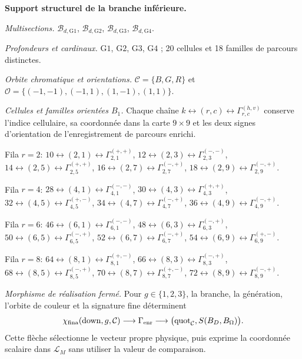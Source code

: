 \medskip
{}
\noindent\textbf{Support structurel de la branche inférieure.}\par
\noindent\textit{Multisections.} \(\mathcal B_{d,\mathrm{G1}}\), \(\mathcal B_{d,\mathrm{G2}}\), \(\mathcal B_{d,\mathrm{G3}}\), \(\mathcal B_{d,\mathrm{G4}}\).\par
\noindent\textit{Profondeurs et cardinaux.} $\mathrm{G1}$, $\mathrm{G2}$, $\mathrm{G3}$, $\mathrm{G4}$ ; 20 cellules et 18 familles de parcours distinctes.\par
\noindent\textit{Orbite chromatique et orientations.} $\mathcal C=\{B,G,R\}$ et $\mathcal O=\{(-1,-1),(-1,1),(1,-1),(1,1)\}$.\par
\noindent\textit{Cellules et familles orientées $B_1$.} Chaque chaîne $k\leftrightarrow(r,c)\leftrightarrow\Gamma_{r,c}^{(h,v)}$ conserve l’indice cellulaire, sa coordonnée dans la carte $9\times9$ et les deux signes d’orientation de l’enregistrement de parcours enrichi.\par
\noindent Fila $r=2$: $10\leftrightarrow(2,1)\leftrightarrow\Gamma_{2,1}^{(+,+)}$, $12\leftrightarrow(2,3)\leftrightarrow\Gamma_{2,3}^{(-,-)}$, $14\leftrightarrow(2,5)\leftrightarrow\Gamma_{2,5}^{(+,+)}$, $16\leftrightarrow(2,7)\leftrightarrow\Gamma_{2,7}^{(-,+)}$, $18\leftrightarrow(2,9)\leftrightarrow\Gamma_{2,9}^{(-,+)}$.\par
\noindent Fila $r=4$: $28\leftrightarrow(4,1)\leftrightarrow\Gamma_{4,1}^{(-,-)}$, $30\leftrightarrow(4,3)\leftrightarrow\Gamma_{4,3}^{(+,+)}$, $32\leftrightarrow(4,5)\leftrightarrow\Gamma_{4,5}^{(+,-)}$, $34\leftrightarrow(4,7)\leftrightarrow\Gamma_{4,7}^{(-,+)}$, $36\leftrightarrow(4,9)\leftrightarrow\Gamma_{4,9}^{(-,+)}$.\par
\noindent Fila $r=6$: $46\leftrightarrow(6,1)\leftrightarrow\Gamma_{6,1}^{(-,-)}$, $48\leftrightarrow(6,3)\leftrightarrow\Gamma_{6,3}^{(-,+)}$, $50\leftrightarrow(6,5)\leftrightarrow\Gamma_{6,5}^{(-,+)}$, $52\leftrightarrow(6,7)\leftrightarrow\Gamma_{6,7}^{(-,+)}$, $54\leftrightarrow(6,9)\leftrightarrow\Gamma_{6,9}^{(+,-)}$.\par
\noindent Fila $r=8$: $64\leftrightarrow(8,1)\leftrightarrow\Gamma_{8,1}^{(+,-)}$, $66\leftrightarrow(8,3)\leftrightarrow\Gamma_{8,3}^{(-,+)}$, $68\leftrightarrow(8,5)\leftrightarrow\Gamma_{8,5}^{(-,+)}$, $70\leftrightarrow(8,7)\leftrightarrow\Gamma_{8,7}^{(+,-)}$, $72\leftrightarrow(8,9)\leftrightarrow\Gamma_{8,9}^{(-,+)}$.\par
\noindent\textit{Morphisme de réalisation fermé.} Pour $g\in\{1,2,3\}$, la branche, la génération, l’orbite de couleur et la signature fine déterminent
\[\chi_{\rm fina}(\operatorname{down},g,\mathcal C)\longrightarrow\Gamma_{\rm enr}\longrightarrow\bigl(\operatorname{quot}_{\mathcal C},S(B_D,B_\Omega)\bigr).\]
Cette flèche sélectionne le vecteur propre physique, puis exprime la coordonnée scalaire dans $\mathcal L_M$ sans utiliser la valeur de comparaison.\par
\medskip
\endgroup
